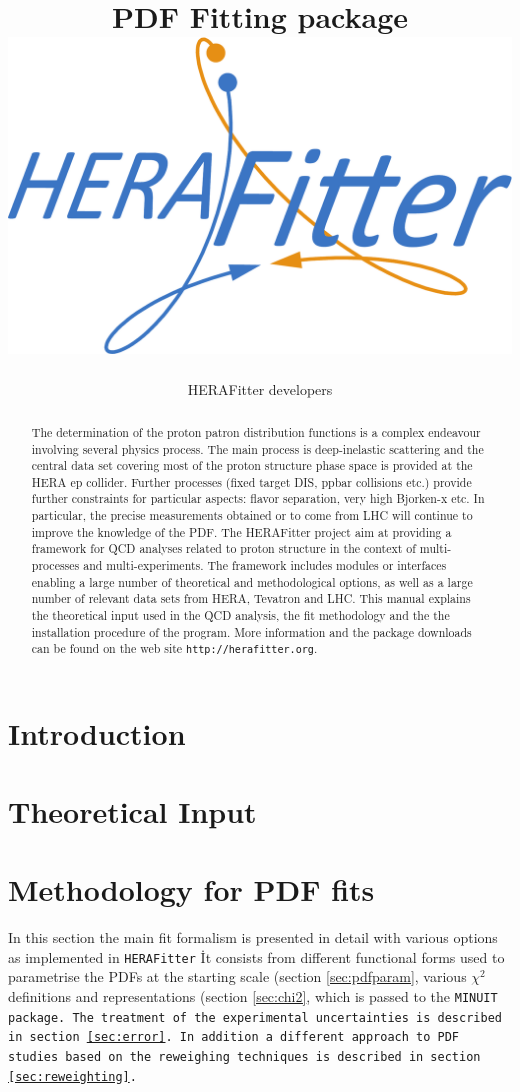 \documentclass[11pt,twoside,a4paper]{article}
\title{ \vspace{1cm} {\Huge \fitter\ } \\
              PDF Fitting package  \\ 
              \vspace{0.5cm}
\includegraphics[width=0.25\linewidth]{figures/logo.pdf}}
\author{HERAFitter developers}
\newcommand\fitter{ \mbox{\tt HERAFitter} }
\begin{document}
\maketitle
\vspace{4cm}
\begin{abstract}
\vspace{0.5cm}
The determination of the  proton patron distribution functions is a complex endeavour involving several physics process. The main process is deep-inelastic scattering and the central  data set covering most of the proton structure phase space is provided at the HERA ep collider. Further processes (fixed target DIS, ppbar collisions etc.) provide further constraints for particular aspects: flavor separation, very high Bjorken-x etc. In particular, the precise measurements obtained or to come from LHC will continue to improve the knowledge of the PDF. The HERAFitter project aim at providing a framework for QCD analyses related to proton structure in the context of multi-processes and multi-experiments. The framework includes modules or interfaces enabling a large number of theoretical and methodological options, as well as a large number of relevant data sets from HERA, Tevatron and LHC. This manual explains the theoretical input used in the QCD analysis, the fit  methodology and the  the installation procedure of the program. More information and the package downloads can be found on the web site {\tt http://herafitter.org}.
\end{abstract}
\thispagestyle{empty}
\newpage
\tableofcontents
\newpage
\section{Introduction}
  
\section{Theoretical Input}


\section{Methodology for PDF fits}
In this section the main fit formalism is presented in detail with various options 
as implemented in \fitter\. It consists from different functional forms used to 
parametrise the PDFs at the starting scale (section \ref{sec:pdfparam}, 
various $\chi^2$ definitions and representations (section \ref{sec:chi2}, 
which is passed to the \tt MINUIT \rm package. The treatment of the experimental 
uncertainties is described in section \ref{sec:error}. In addition a different approach 
to PDF studies based on the reweighing techniques is described in section \ref{sec:reweighting}.
\end{document}
